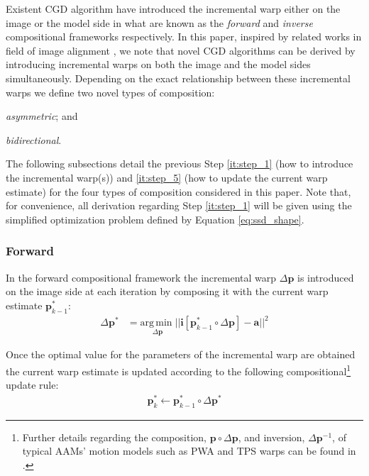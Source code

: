 Existent CGD algorithm have introduced the incremental warp either on the image or the model side in what are known as the \emph{forward} and \emph{inverse} compositional frameworks \cite{Matthews2004, Gross2005, Papandreou2008, Amberg2009, Martins2010, Tzimiropoulos2013} respectively. In this paper, inspired by related works in field of image alignment \cite{Malis2004, Megret2008, Autheserre2009, Megret2010}, we note that novel CGD algorithms can be derived by introducing incremental warps on both the image and the model sides simultaneously. Depending on the exact relationship between these incremental warps we define two novel types of composition:
\begin{inparaenum}
    \item \emph{asymmetric}; and
    \item \emph{bidirectional}.
\end{inparaenum}

The following subsections detail the previous Step \ref{it:step_1} (how to introduce the incremental warp(s)) and \ref{it:step_5} (how to update the current warp estimate) for the four types of composition considered in this paper. Note that, for convenience, all derivation regarding Step \ref{it:step_1} will be given using the simplified optimization problem defined by Equation \ref{eq:ssd_shape}.

\subsubsection{Forward}
\label{sec:forward}

In the forward compositional framework the incremental warp $\Delta \mathbf{p}$ is introduced on the image side at each iteration by composing it with the current warp estimate $\mathbf{p}_{k-1}^*$:
\begin{equation}
    \begin{aligned}
        \Delta \mathbf{p}^* & = \underset{\Delta \mathbf{p}} {\mathrm{arg\, min\;}} || \mathbf{i}[\mathbf{p}_{k-1}^* \circ \Delta \mathbf{p}] - \mathbf{a} ||^2
    \label{eq:ssd_fc}
    \end{aligned}
\end{equation}

Once the optimal value for the parameters of the incremental warp are obtained the current warp estimate is updated according to the following compositional\footnote{\label{foot:warp}Further details regarding the composition, $\mathbf{p} \circ \Delta \mathbf{p}$, and inversion, $\Delta \mathbf{p}^{-1}$, of typical AAMs' motion models such as PWA and TPS warps can be found in \cite{Matthews2004, Papandreou2008}.} update rule:
\begin{equation}
 	\begin{aligned}
    	\mathbf{p}_k^* \leftarrow \mathbf{p}_{k-1}^* \circ \Delta \mathbf{p}^*
    \label{eq:fc_update}
    \end{aligned}
\end{equation}

